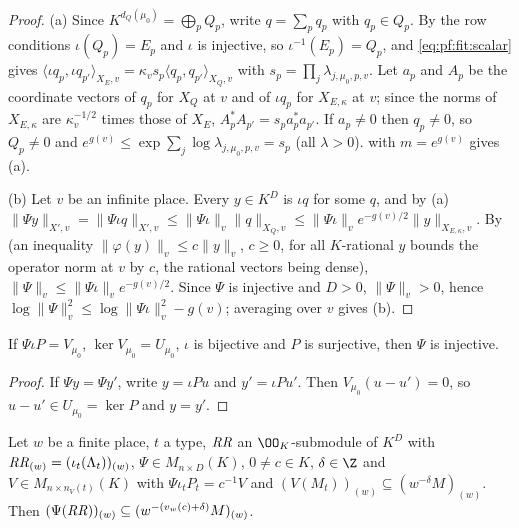 \begin{proof}
(a) Since $K^{d_Q(\mu_0)}=\bigoplus_pQ_p$, write $q=\sum_pq_p$ with $q_p\in Q_p$. By the row conditions
$\iota(Q_p)=E_p$ and $\iota$ is injective, so $\iota^{-1}(E_p)=Q_p$, and \eqref{eq:pf:fit:scalar} gives
$\langle\iota q_p,\iota q_{p'}\rangle_{X_E,v}=\kappa_vs_p\langle q_p,q_{p'}\rangle_{X_Q,v}$ with
$s_p=\prod_j\lambda_{j,\mu_0,p,v}$. Let $a_p$ and $A_p$ be the coordinate vectors of $q_p$ for $X_Q$ at $v$ and of
$\iota q_p$ for $X_{E,\kappa}$ at $v$; since the norms of $X_{E,\kappa}$ are $\kappa_v^{-1/2}$ times those of $X_E$,
$A_p^*A_{p'}=s_pa_p^*a_{p'}$. If $a_p\ne0$ then $q_p\ne0$, so $Q_p\ne0$ and $e^{g(v)}\le
\exp\sum_j\log\lambda_{j,\mu_0,p,v}=s_p$ (all $\lambda>0$).  with $m=e^{g(v)}$ gives (a).

(b) Let $v$ be an infinite place. Every $y\in K^D$ is $\iota q$ for some $q$, and by (a)
$\|\Psi y\|_{X',v}=\|\Psi\iota q\|_{X',v}\le\|\Psi\iota\|_v\|q\|_{X_Q,v}\le\|\Psi\iota\|_ve^{-g(v)/2}\|y\|_{X_{E,\kappa},v}$.
By  (an inequality
$\|\varphi(y)\|_v\le c\|y\|_v$, $c\ge0$, for all $K$-rational $y$ bounds the operator norm at $v$ by $c$, the rational
vectors being dense), $\|\Psi\|_v\le\|\Psi\iota\|_ve^{-g(v)/2}$. Since $\Psi$ is injective and $D>0$, $\|\Psi\|_v>0$,
hence $\log\|\Psi\|_v^2\le\log\|\Psi\iota\|_v^2-g(v)$; averaging over $v$ gives (b).
\end{proof}

\begin{lemma}[Injectivity]\label{pf:fit:psiinj}
If $\Psi\iota P=V_{\mu_0}$, $\ker V_{\mu_0}=U_{\mu_0}$, $\iota$ is bijective and $P$ is surjective, then $\Psi$ is
injective.
\end{lemma}

\begin{proof}
If $\Psi y=\Psi y'$, write $y=\iota Pu$ and $y'=\iota Pu'$. Then $V_{\mu_0}(u-u')=0$, so $u-u'\in U_{\mu_0}=\ker P$ and
$y=y'$.
\end{proof}

\begin{lemma}\label{pf:fit:hencelocal}
Let $w$ be a finite place, $t$ a type, $\mathit{RR}$ an $\OO_K$-submodule of $K^D$ with
$\mathit{RR}_{(w)}=(\iota_t(\Lambda_t))_{(w)}$, $\Psi\in M_{n\times D}(K)$, $0\ne c\in K$, $\delta\in\Z$ and $V\in
M_{n\times n_V(t)}(K)$ with $\Psi\iota_tP_t=c^{-1}V$ and $(V(M_t))_{(w)}\subseteq(w^{-\delta}M)_{(w)}$. Then
$(\Psi(\mathit{RR}))_{(w)}\subseteq(w^{-(v_w(c)+\delta)}M)_{(w)}$.
\end{lemma}

